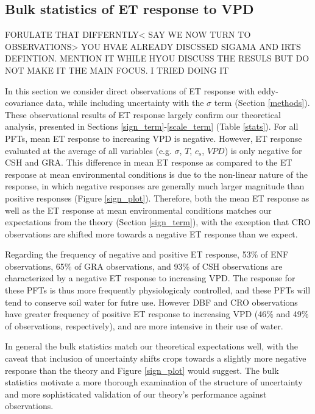 \documentclass[draft,linenumbers]{agujournal}
\begin{document}
\subsection{Bulk statistics of ET response to VPD}
\label{stats_sec}
FORULATE THAT DIFFERNTLY< SAY WE NOW TURN TO OBSERVATIONS> YOU HVAE ALREADY DISCSSED SIGAMA AND IRTS DEFINTION. MENTION IT WHILE HYOU DISCUSS THE RESULS BUT DO NOT MAKE IT THE MAIN FOCUS. I TRIED DOING IT

In this section we consider direct observations of ET response with eddy-covariance data, while including uncertainty with the $\sigma$ term (Section \ref{methods}). These observational results of ET response largely confirm our theoretical analysis, presented in Sections \ref{sign_term}-\ref{scale_term} (Table \ref{stats}). For all PFTs, mean ET response to increasing VPD is negative. However, ET response evaluated at the average of all variables (e.g. $\sigma$, $T$, $c_s$, $VPD$) is only negative for CSH and GRA. This difference in mean ET response as compared to the ET response at mean environmental conditions is due to the non-linear nature of the response, in which negative responses are generally much larger magnitude than positive responses (Figure \ref{sign_plot}). Therefore, both the mean ET response as well as the ET response at mean environmental conditions matches our expectations from the theory (Section \ref{sign_term}), with the exception that CRO observations are shifted more towards a negative ET response than we expect.

Regarding the frequency of negative and positive ET response, 53\% of ENF observations, 65\% of GRA observations, and 93\% of CSH observations are characterized by a negative ET response to increasing VPD. The response for these PFTs is thus more frequently physiologicaly controlled, and these PFTs will tend to conserve soil water for futre use. However DBF and CRO observations have greater frequency of positive ET response to increasing VPD (46\% and 49\% of observations, respectively), and are more intensive in their use of water. 

In general the bulk statistics match our theoretical expectations well, with the caveat that inclusion of uncertainty shifts crops towards a slightly more negative response than the theory and Figure \ref{sign_plot} would suggest. The bulk statistics motivate a more thorough examination of the structure of uncertainty and more sophisticated validation of our theory's performance against observations. 
\end{document}
